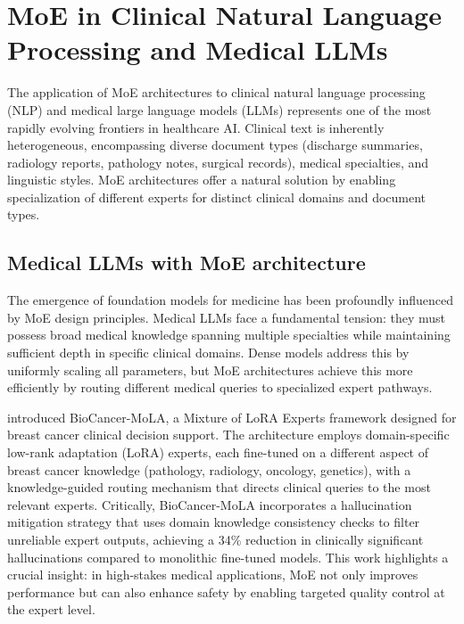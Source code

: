
\section*{MoE in Clinical Natural Language Processing and Medical LLMs}

The application of MoE architectures to clinical natural language processing (NLP) and medical large language models (LLMs) represents one of the most rapidly evolving frontiers in healthcare AI. Clinical text is inherently heterogeneous, encompassing diverse document types (discharge summaries, radiology reports, pathology notes, surgical records), medical specialties, and linguistic styles. MoE architectures offer a natural solution by enabling specialization of different experts for distinct clinical domains and document types.

\subsection*{Medical LLMs with MoE architecture}

The emergence of foundation models for medicine has been profoundly influenced by MoE design principles. Medical LLMs face a fundamental tension: they must possess broad medical knowledge spanning multiple specialties while maintaining sufficient depth in specific clinical domains. Dense models address this by uniformly scaling all parameters, but MoE architectures achieve this more efficiently by routing different medical queries to specialized expert pathways.

\cite{bechar2025biocancer_moe} introduced BioCancer-MoLA, a Mixture of LoRA Experts framework designed for breast cancer clinical decision support. The architecture employs domain-specific low-rank adaptation (LoRA) experts, each fine-tuned on a different aspect of breast cancer knowledge (pathology, radiology, oncology, genetics), with a knowledge-guided routing mechanism that directs clinical queries to the most relevant experts. Critically, BioCancer-MoLA incorporates a hallucination mitigation strategy that uses domain knowledge consistency checks to filter unreliable expert outputs, achieving a 34\% reduction in clinically significant hallucinations compared to monolithic fine-tuned models. This work highlights a crucial insight: in high-stakes medical applications, MoE not only improves performance but can also enhance safety by enabling targeted quality control at the expert level.

